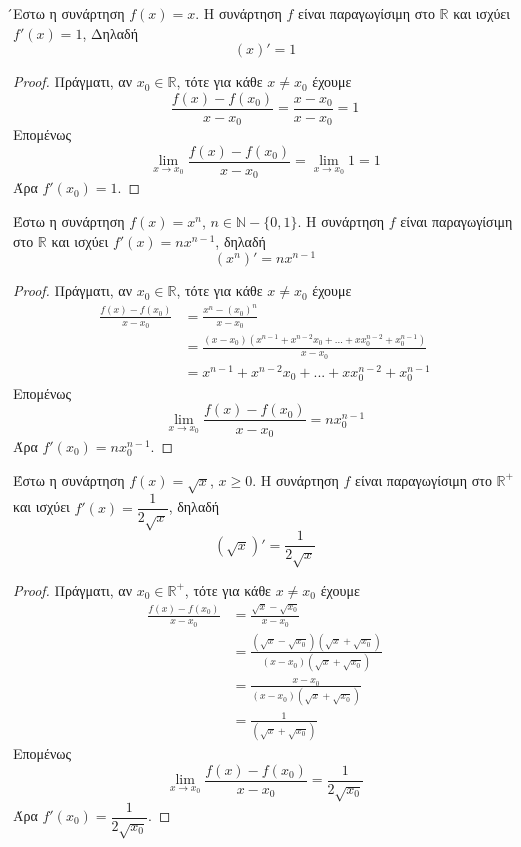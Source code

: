 \documentclass[a4paper, 12pt]{article}
\begin{document}
\begin{theorem}{}
  ́Εστω η συνάρτηση $f(x) = x$. Η συνάρτηση $f$ είναι παραγωγίσιμη
  στο $\mathbb{R}$ και ισχύει $f'(x)=1$, Δηλαδή
  $$(x)'=1$$
\end{theorem}
\begin{proof}
  Πράγματι, αν $x_0\in\mathbb{R}$, τότε για κάθε $x\ne x_0$ έχουμε
  $$ \frac{f(x)-f(x_0)}{x-x_0}=\frac{x-x_0}{x-x_0}=1$$
  Επομένως
  $$\lim_{x\to x_0}\frac{f(x)-f(x_0)}{x-x_0}=\lim_{x\to x_0}1=1$$
  Άρα $f'(x_0)=1$.
\end{proof}

\begin{theorem}{}
  Έστω η  συνάρτηση $f(x)=x^n$, $n\in\mathbb{N}-\{0,1\}$. Η συνάρτηση $f$ είναι παραγωγίσιμη στο $\mathbb{R}$ και ισχύει $f'(x)=nx^{n-1}$, δηλαδή
  $$(x^n)'=nx^{n-1}$$
\end{theorem}
\begin{proof}
  Πράγματι, αν $x_0\in\mathbb{R}$, τότε για κάθε $x\ne x_0$ έχουμε
  \begin{align*}
    \frac{f(x)-f(x_0)}{x-x_0} & =\frac{x^n-(x_0)^n}{x-x_0}                                          \\
                              & =\frac{(x-x_0)(x^{n-1}+x^{n-2}x_0+...+xx_0^{n-2}+x_0^{n-1})}{x-x_0} \\
                              & =x^{n-1}+x^{n-2}x_0+...+xx_0^{n-2}+x_0^{n-1}
  \end{align*}
  Επομένως
  $$\lim_{x\to x_0}\frac{f(x)-f(x_0)}{x-x_0}=nx_0^{n-1}$$
  Άρα $f'(x_0)=nx_0^{n-1}$.
\end{proof}

\begin{theorem}{}
  Έστω η συνάρτηση $f(x)=\sqrt{x}$, $x\geq 0$. Η συνάρτηση $f$ είναι παραγωγίσιμη στο $\mathbb{R}^+$ και ισχύει $f'(x)=\dfrac{1}{2\sqrt{x}}$, δηλαδή
  $$(\sqrt{x})'=\frac{1}{2\sqrt{x}}$$
\end{theorem}
\begin{proof}
  Πράγματι, αν $x_0\in\mathbb{R}^+$, τότε για κάθε $x\ne x_0$ έχουμε
  \begin{align*}
    \frac{f(x)-f(x_0)}{x-x_0} & =\frac{\sqrt{x}-\sqrt{x_0}}{x-x_0}                                               \\
                              & =\frac{(\sqrt{x}-\sqrt{x_0})(\sqrt{x}+\sqrt{x_0})}{(x-x_0)(\sqrt{x}+\sqrt{x_0})} \\
                              & =\frac{x-x_0}{(x-x_0)(\sqrt{x}+\sqrt{x_0})}                                      \\
                              & =\frac{1}{(\sqrt{x}+\sqrt{x_0})}
  \end{align*}
  Επομένως
  $$\lim_{x\to x_0}\frac{f(x)-f(x_0)}{x-x_0}=\frac{1}{2\sqrt{x_0}}$$
  Άρα $f'(x_0)=\dfrac{1}{2\sqrt{x_0}}$.
\end{proof}
\end{document}
